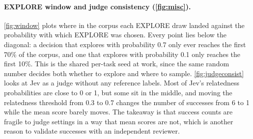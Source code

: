 \documentclass{article}
\newcommand{\para}[1]{\paragraph{#1}}
\begin{document}
\para{EXPLORE window and judge consistency (\autoref{fig:misc}).}
\autoref{fig:window} plots where in the corpus each EXPLORE draw landed against the probability with which EXPLORE was chosen.
Every point lies below the diagonal: a decision that explores with probability 0.7 only ever reaches the first 70\% of the corpus, and one that explores with probability 0.1 only reaches the first 10\%.
This is the shared per-task seed at work, since the same random number decides both whether to explore and where to sample.
\autoref{fig:judgeconsist} looks at Jev as a judge without any reference labels.
Most of Jev's relatedness probabilities are close to 0 or 1, but some sit in the middle, and moving the relatedness threshold from 0.3 to 0.7 changes the number of successes from 6 to 1 while the mean score barely moves.
The takeaway is that success counts are fragile to judge settings in a way that mean scores are not, which is another reason to validate successes with an independent reviewer.

\begin{table}[htbp]
  \caption{Mean child judge score (refusal rate) by parent bucket and action, pooled over 480 transitions from the four score-objective, Meta-judged arms. Bold marks the best action per bucket where it is clear; the $\geq 80$ row rests on 20 transitions. Following the analysis scripts, parents scoring exactly 80 fall in the 50 to 80 row.}
  \label{tab:transitions}
  \centering
  \small
\end{table}
\end{document}
